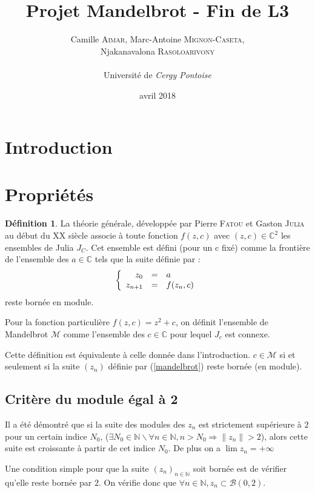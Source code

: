 \documentclass[12pt,a4paper]{report}
\title{Projet Mandelbrot - Fin de L3}
\author{Camille \textsc{Aimar}, Marc-Antoine \textsc{Mignon-Caseta},\\Njakanavalona \textsc{Rasoloarivony} \\ \\ Université de\emph{ Cergy Pontoise}}
\date{avril 2018}
\theoremstyle{plain}
\theoremstyle{plain}
\theoremstyle{definition}
\newtheorem{definition}{Définition}
\theoremstyle{remark}
\begin{document}
\maketitle
\setcounter{chapter}{1}
\section{Introduction}

\newpage
\section{Propriétés}
	\begin{definition}
La théorie générale, développée par Pierre \textsc{Fatou} et Gaston \textsc{Julia} au début du \textsc{XX}\ieme {} siècle associe à toute fonction $f(z,c)$ avec $(z,c) \in \mathbb{C}^2$ les ensembles de Julia $J_C$. Cet ensemble est défini (pour un c fixé) comme la frontière de l'ensemble des $a \in \mathbb{C}$ tels que la suite définie par :
\begin{equation}\label{julia}
\left\{
\begin{array}{r c l}
z_0 &=& a\\
z_{n+1} &=& f(z_n, c)
\end{array}
\right.
\end{equation}
reste bornée en module.
\end{definition}

Pour la fonction particulière $f(z,c)=z^2+c$, on définit l'ensemble de Mandelbrot $\mathcal{M}$ comme l'ensemble des $c \in \mathbb{C}$ pour lequel $J_c$ est connexe.

Cette définition est équivalente à celle donnée dans l'introduction. $c \in \mathcal{M}$ si et seulement si la suite $(z_n)$ définie par (\ref{mandelbrot}) reste bornée (en module).

	\subsection{Critère du module égal à 2}
Il a été démontré que si la suite des modules des $z_n$ est strictement supérieure à $2$ pour un certain indice $N_0$,
($\exists N_0 \in \mathbb{N} \backslash \forall n \in \mathbb{N},{} n>N_0 \Longrightarrow \|z_n\|>2$), alors cette suite est croissante à partir de cet indice $N_0$. De plus on a $\lim z_n = +\infty$

Une condition simple pour que la suite $(z_n)_{n \in \mathbb{N}}$ soit bornée est de vérifier qu'elle reste bornée par $2$. On vérifie donc que $\forall n \in \mathbb{N}, z_n \subset \mathcal{B}(0,2)$.
\end{document}
